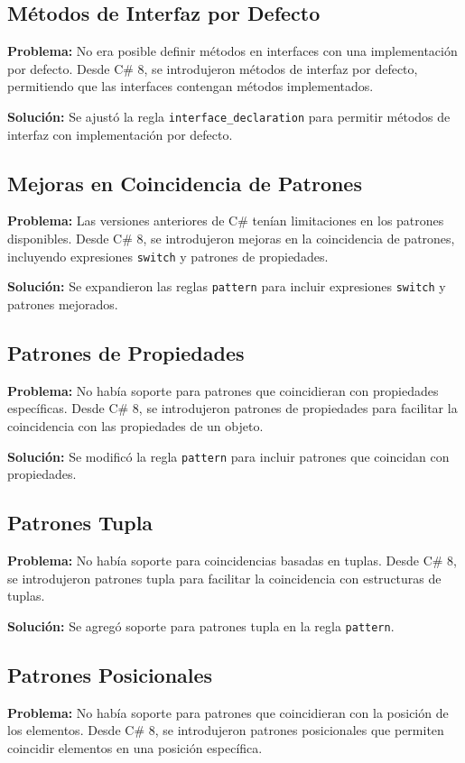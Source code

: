 \subsection*{Métodos de Interfaz por Defecto}
\textbf{Problema:} No era posible definir métodos en interfaces con una implementación por defecto. Desde C\# 8, se introdujeron métodos de interfaz por defecto, permitiendo que las interfaces contengan métodos implementados.

\textbf{Solución:} Se ajustó la regla \texttt{interface\_declaration} para permitir métodos de interfaz con implementación por defecto.

\subsection*{Mejoras en Coincidencia de Patrones}
\textbf{Problema:} Las versiones anteriores de C\# tenían limitaciones en los patrones disponibles. Desde C\# 8, se introdujeron mejoras en la coincidencia de patrones, incluyendo expresiones \texttt{switch} y patrones de propiedades.

\textbf{Solución:} Se expandieron las reglas \texttt{pattern} para incluir expresiones \texttt{switch} y patrones mejorados.

\subsection*{Patrones de Propiedades}
\textbf{Problema:} No había soporte para patrones que coincidieran con propiedades específicas. Desde C\# 8, se introdujeron patrones de propiedades para facilitar la coincidencia con las propiedades de un objeto.

\textbf{Solución:} Se modificó la regla \texttt{pattern} para incluir patrones que coincidan con propiedades.

\subsection*{Patrones Tupla}
\textbf{Problema:} No había soporte para coincidencias basadas en tuplas. Desde C\# 8, se introdujeron patrones tupla para facilitar la coincidencia con estructuras de tuplas.

\textbf{Solución:} Se agregó soporte para patrones tupla en la regla \texttt{pattern}.

\subsection*{Patrones Posicionales}
\textbf{Problema:} No había soporte para patrones que coincidieran con la posición de los elementos. Desde C\# 8, se introdujeron patrones posicionales que permiten coincidir elementos en una posición específica.

